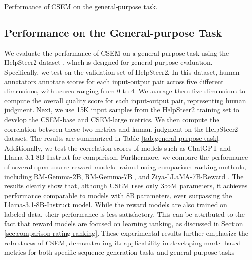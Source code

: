 \documentclass[lettersize,journal]{IEEEtran}
\begin{document}
\begin{table}[!t]
    \centering
    \caption{Performance of CSEM on the general-purpose task.}
    \scalebox{0.9}{
    }
    \label{tab:general-purpose-task}
\end{table}

\subsection{Performance on the General-purpose Task}
We evaluate the performance of CSEM on a general-purpose task using the HelpSteer2 dataset \cite{wang2024helpsteer2}, which is designed for general-purpose evaluation. Specifically, we test on the validation set of HelpSteer2. In this dataset, human annotators annotate scores for each input-output pair across five different dimensions, with scores ranging from 0 to 4. We average these five dimensions to compute the overall quality score for each input-output pair, representing human judgment. Next, we use 15K input samples from the HelpSteer2 training set to develop the CSEM-base and CSEM-large metrics. We then compute the correlation between these two metrics and human judgment on the HelpSteer2 dataset. The results are summarized in Table \ref{tab:general-purpose-task}. Additionally, we test the correlation scores of models such as ChatGPT and Llama-3.1-8B-Instruct for comparison. Furthermore, we compare the performance of several open-source reward models trained using comparison ranking methods, including RM-Gemma-2B, RM-Gemma-7B \cite{dong2023raft}, and Ziya-LLaMA-7B-Reward \cite{ziya-reward-7B}. The results clearly show that, although CSEM uses only 355M parameters, it achieves performance comparable to models with 8B parameters, even surpassing the Llama-3.1-8B-Instruct model. While the reward models are also trained on labeled data, their performance is less satisfactory. This can be attributed to the fact that reward models are focused on learning ranking, as discussed in Section \ref{sec:comparison-rating-ranking}. These experimental results further emphasize the robustness of CSEM, demonstrating its applicability in developing model-based metrics for both specific sequence generation tasks and general-purpose tasks.
\end{document}
